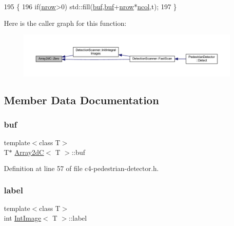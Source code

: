 \begin{DoxyCode}
195 \{
196     \textcolor{keywordflow}{if}(\mbox{\hyperlink{class_array2d_c_a12f690f7195f7674a86a7e1eedbc473c}{nrow}}>0) std::fill(\mbox{\hyperlink{class_array2d_c_a25d8fa5049d4c7ded126e0acdd18f37a}{buf}},\mbox{\hyperlink{class_array2d_c_a25d8fa5049d4c7ded126e0acdd18f37a}{buf}}+\mbox{\hyperlink{class_array2d_c_a12f690f7195f7674a86a7e1eedbc473c}{nrow}}*\mbox{\hyperlink{class_array2d_c_a27e0f8f40f644831cd7c750db59dc28a}{ncol}},t);
197 \}
\end{DoxyCode}
Here is the caller graph for this function\+:
\nopagebreak
\begin{figure}[H]
\begin{center}
\leavevmode
\includegraphics[width=350pt]{class_array2d_c_a5e1d7837fd208699694fc3fc97151df0_icgraph}
\end{center}
\end{figure}


\subsection{Member Data Documentation}
\mbox{\label{class_array2d_c_a25d8fa5049d4c7ded126e0acdd18f37a}} 
\subsubsection{\texorpdfstring{buf}{buf}}
{\footnotesize\ttfamily template$<$class T$>$ \\
T$\ast$ \mbox{\hyperlink{class_array2d_c}{Array2dC}}$<$ T $>$\+::buf\hspace{0.3cm}{\ttfamily [inherited]}}



Definition at line 57 of file c4-\/pedestrian-\/detector.\+h.

\mbox{\label{class_int_image_aeeeaa5da82f21cdc95ab3f941aa405e7}} 
\subsubsection{\texorpdfstring{label}{label}}
{\footnotesize\ttfamily template$<$class T$>$ \\
int \mbox{\hyperlink{class_int_image}{Int\+Image}}$<$ T $>$\+::label}



